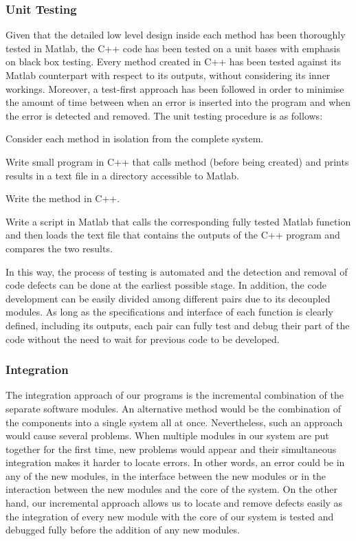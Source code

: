 \documentclass[11pt,a4paper]{article}
\begin{document}
\subsubsection{Unit Testing}
\noindent
Given that the detailed low level design inside each method has been thoroughly tested in Matlab, the C++ code has been tested on a unit bases with emphasis on black box testing. Every method created in C++ has been tested against its Matlab counterpart with respect to its outputs, without considering its inner workings. Moreover, a test-first approach has been followed in order to minimise the amount of time between when an error is inserted into the program and when the error is detected and removed. The unit testing procedure is as follows:
\begin{compactitem}
\item Consider each method in isolation from the complete system.
\item Write small program in C++ that calls method (before being created) and prints results in a text file in a directory accessible to Matlab.
\item Write the method in C++.
\item Write a script in Matlab that calls the corresponding fully tested Matlab function and then loads the text file that contains the outputs of the C++ program and compares the two results.
\end{compactitem}

\noindent
In this way, the process of testing is automated and the detection and removal of code defects can be done at the earliest possible stage. In addition, the code development can be easily divided among different pairs due to its decoupled modules. As long as the specifications and interface of each function is clearly defined, including its outputs, each pair can fully test and debug their part of the code without the need to wait for previous code to be developed.

\subsubsection{Integration}
\noindent
The integration approach of our programs is the incremental combination of the separate software modules. An alternative method would be the combination of the components into a single system all at once. Nevertheless, such an approach would cause several problems. When multiple modules in our system are put together for the first time, new problems would appear and their simultaneous integration makes it harder to locate errors. In other words, an error could be in any of the new modules, in the interface between the new modules or in the interaction between the new modules and the core of the system. On the other hand, our incremental approach allows us to locate and remove defects easily as the integration of every new module with the core of our system is tested and debugged fully before the addition of any new modules.
 
\end{document}
